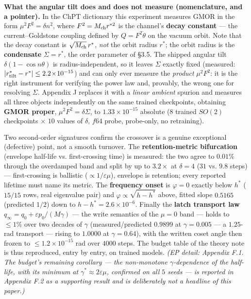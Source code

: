 \documentclass[10pt]{article}
\begin{document}
\textbf{What the angular tilt does and does not measure (nomenclature, and a pointer).} In the ChPT dictionary this experiment measures GMOR in the form $\mu^2F^2=\delta n^2$, where $F^2=M_{\rm ch}r^{*2}$ is the channel's \textbf{decay constant} --- the current--Goldstone coupling defined by $Q=F^2\dot\theta$ on the vacuum orbit. Note that the decay constant is $\sqrt{M_{\rm ch}}\,r^*$, \emph{not} the orbit radius $r^*$; the orbit radius is the \textbf{condensate} $\Sigma=r^*$, the order parameter of \S3.5. The shipped angular tilt $\delta(1-\cos n\theta)$ is radius-independent, so it leaves $\Sigma$ exactly fixed (measured: $|r^*_{\rm tilt}-r^*|\le2.2\!\times\!10^{-15}$) and can only ever measure the \emph{product} $\mu^2F^2$: it is the right instrument for verifying the power law and, provably, the wrong one for resolving $\Sigma$. Appendix J replaces it with a \emph{linear ambient} spurion and measures all three objects independently on the same trained checkpoints, obtaining \textbf{GMOR proper}, $\mu^2F^2=\delta\Sigma$, to $1.33\!\times\!10^{-15}$ absolute ($8$ trained $SO(2)$ checkpoints $\times$ $10$ values of $\delta$, $f64$ probe, probe-only, no retraining).

Two second-order signatures confirm the crossover is a genuine exceptional (defective) point, not a smooth turnover. The \textbf{retention-metric bifurcation} (envelope half-life vs. first-crossing time) is measured: the two agree to $0.01\%$ through the overdamped band and split by up to $3.2\times$ at $\delta=4$ ($31$ vs. $9.8$ steps) --- first-crossing is ballistic ($\propto1/\varepsilon\mu$), envelope is retention; every reported lifetime must name its metric. The \textbf{frequency onset} is $\varphi=0$ exactly below $h^*$ ($15/15$ rows, real eigenvalue pair) and $\varphi\propto\sqrt{h-h^*}$ above, fitted slope $0.5165$ (predicted $1/2$) down to $h-h^*=2.6\!\times\!10^{-6}$. Finally the \textbf{latch transport law} $q_\infty=q_0+\varepsilon p_0/(M\gamma)$ --- the write semantics of the $\mu=0$ band --- holds to $\le1\%$ over two decades of $\gamma$ (measured/predicted $0.9899$ at $\gamma=0.005$ --- a $1.25$-rad transport --- rising to $1.0000$ at $\gamma=0.64$), with the written coset angle then frozen to $\le1.2\!\times\!10^{-15}$ rad over $4000$ steps. The budget table of the theory note is thus reproduced, entry by entry, on trained models. \emph{(EP detail: Appendix F.1. The budget's remaining corollary --- the non-monotone $\gamma$-dependence of the half-life, with its minimum at $\gamma^*\approx2\varepsilon\mu$, confirmed on all $5$ seeds --- is reported in Appendix F.2 as a supporting result and is deliberately not a headline of this paper.)}
\end{document}

